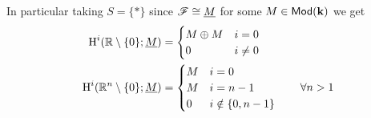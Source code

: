 \documentclass[../../main]{subfiles}
\begin{document}
\begin{example}
  In particular taking \(S = \{\ast\}\) since \(\mathscr{F} \cong \underline{M}\) for some \(M \in \mathsf{Mod}(\mathbf{k})\) we get
  \begin{align*}
     \operatorname{H}^{i}(\mathbb{R} \setminus \{0\}; \underline{M}) &= \begin{cases}
      M \oplus M & i = 0 \\
      0 & i \neq 0
     \end{cases} \\
    \operatorname{H}^{i}(\mathbb{R}^{n} \setminus \{0\}; \underline{M}) &= \begin{cases}
      M & i = 0 \\
      M & i = n-1 \\
      0 & i \notin \{0, n-1\}
    \end{cases} \qquad \forall n > 1
  \end{align*}
\end{example}
\end{document}
